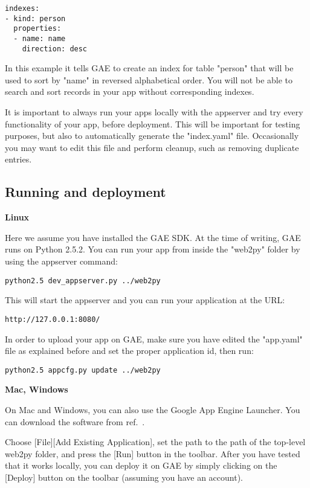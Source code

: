 \documentclass[justified,sixbynine,notoc]{tufte-book}
\begin{document}
\begin{fullwidth}
\begin{lstlisting}
indexes:
- kind: person
  properties:
  - name: name
    direction: desc
\end{lstlisting}

In this example it tells GAE to create an index for table "person" that will be used to sort by "name" in reversed alphabetical order. You will not be able to search and sort records in your app without corresponding indexes.

It is important to always run your apps locally with the appserver and try every functionality of your app, before deployment. This will be important for testing purposes, but also to automatically generate the "index.yaml" file.
Occasionally you may want to edit this file and perform cleanup, such as removing duplicate entries.

\goodbreak\subsection{Running and deployment}

{\bf Linux}

Here we assume you have installed the GAE SDK.  At the time of writing, GAE runs on Python 2.5.2.  You can run your app from inside the "web2py" folder by using the appserver command:

\begin{lstlisting}
python2.5 dev_appserver.py ../web2py
\end{lstlisting}

This will start the appserver and you can run your application at the URL:

\begin{lstlisting}[keywords={}]
http://127.0.0.1:8080/
\end{lstlisting}

In order to upload your app on GAE, make sure you have edited the "app.yaml" file as explained before and set the proper application id, then run:

\begin{lstlisting}
python2.5 appcfg.py update ../web2py
\end{lstlisting}

{\bf Mac, Windows}

On Mac and Windows, you can also use the Google App Engine Launcher.
You can download the software from ref.~\cite{gae}.

Choose [File][Add Existing Application], set the path to the path of the top-level web2py folder, and press the [Run] button in the toolbar. After you have tested that it works locally, you can deploy it on GAE by simply clicking on the [Deploy] button on the toolbar (assuming you have an account).



\end{fullwidth}
\end{document}
